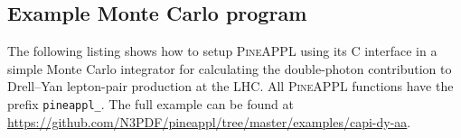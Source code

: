 \subsection{Example Monte Carlo program}
\label{app:example-program}



The following listing shows how to setup \textsc{PineAPPL} using its C interface in a simple Monte Carlo integrator for calculating the double-photon contribution to Drell--Yan lepton-pair production at the LHC.
All \textsc{PineAPPL} functions have the prefix \texttt{pineappl\_}.
The full example can be found at \url{https://github.com/N3PDF/pineappl/tree/master/examples/capi-dy-aa}.

